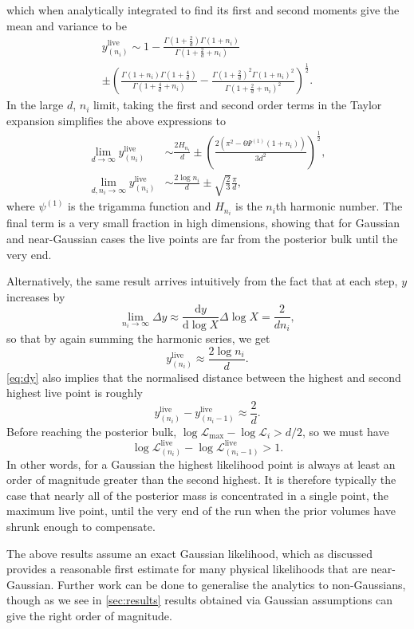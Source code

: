 \documentclass[usenatbib]{mnras}
\newcommand{\nlive}{n_i}
\newcommand{\Like}{\mathcal{L}}
\newcommand{\logLmax}{\log \Like_\mathrm{max}}
\begin{document}
which when analytically integrated to find its first and second moments give the mean and variance to be 
\begin{multline}
    y_{(n_i)}^\mathrm{live} \sim 1-\frac{\Gamma(1+\frac{2}{d})\Gamma(1+n_i)}{\Gamma(1+\frac{2}{d}+n_i)} \\
     \pm \left( \frac{\Gamma(1+n_i)\Gamma(1+\frac{4}{d})}{\Gamma(1+\frac{4}{d}+n_i)} - \frac{\Gamma(1+\frac{2}{d})^2 \Gamma(1+n_i)^2}{\Gamma(1+\frac{2}{d}+n_i)^2}\right)^{\frac{1}{2}}.
    \label{eq:ymax}
\end{multline}
In the large $d$, $n_i$ limit, taking the first and second order terms in the Taylor expansion simplifies the above expressions to 
\begin{align}
    \lim_{d\to\infty} y_{(n_i)}^\mathrm{live} &\sim \frac{2H_{n_i}}{d} \pm \left(\frac{2(\pi^2 - 6\Psi^{(1)}(1+n_i))}{3d^2}\right)^{\frac{1}{2}},
    \label{eq:ymaxd}\\
    \lim_{d,n_i\to\infty} y_{(n_i)}^\mathrm{live} &\sim \frac{2\log n_i}{d} \pm \sqrt{\frac{2}{3}}\frac{\pi}{d},
    \label{eq:ymaxdn}
\end{align}
where $\psi^{(1)}$ is the trigamma function and $H_{n_i}$ is the $n_i$th harmonic number. The final term is a very small fraction in high dimensions, showing that for Gaussian and near-Gaussian cases the live points are far from the posterior bulk until the very end.
\par
Alternatively, the same result arrives intuitively from the fact that at each step, $y$ increases by  
\begin{equation}\label{eq:dy}
    \lim_{\nlive \to \infty}\Delta y \approx \frac{\mathrm{d} y}{\mathrm{d}\log X} \Delta \log X = \frac{2}{d \nlive}, 
\end{equation}
so that by again summing the harmonic series, we get
\begin{equation}
    y_{(\nlive)}^{\mathrm{live}} \approx \frac{2\log \nlive}{d}.
\end{equation}
\cref{eq:dy} also implies that the normalised distance between the highest and second highest live point is roughly 
\begin{equation}
    y_{(\nlive)}^{\mathrm{live}} - y_{(\nlive - 1)}^{\mathrm{live}} \approx \frac{2}{d}.
\end{equation}
Before reaching the posterior bulk, $\logLmax - \log\Like_i > d/2$, so we must have
\begin{equation}
    \log \Like^{\mathrm{live}}_{(\nlive)} - \log \Like^\mathrm{live}_{(\nlive - 1)} > 1.
\end{equation}
In other words, for a Gaussian the highest likelihood point is always at least an order of magnitude greater than the second highest. It is therefore typically the case that nearly all of the posterior mass is concentrated in a single point, the maximum live point, until the very end of the run when the prior volumes have shrunk enough to compensate.
\par
The above results assume an exact Gaussian likelihood, which as discussed provides a reasonable first estimate for many physical likelihoods that are near-Gaussian. Further work can be done to generalise the analytics to non-Gaussians, though as we see in \cref{sec:results} results obtained via Gaussian assumptions can give the right order of magnitude.
\end{document}
